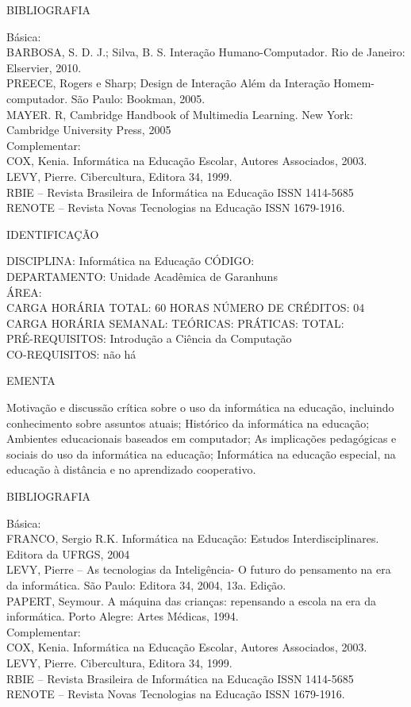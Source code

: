 \documentclass[
	12pt,				%
	openright,			%
  oneside,     %
	a4paper,			%
	chapter=TITLE,		%
	english,			%
	french,				%
	spanish,			%
	brazil				%
	]{abntex2}
\begin{document}
\begin{apendicesenv}
BIBLIOGRAFIA 

Básica:\\
BARBOSA, S. D. J.; Silva, B. S. Interação Humano-Computador. Rio de
Janeiro: Elservier, 2010.\\
PREECE, Rogers e Sharp; Design de Interação  Além da Interação
Homem-computador. São Paulo: Bookman, 2005.\\
MAYER. R, Cambridge Handbook of Multimedia Learning. New York: Cambridge
University Press, 2005\\
Complementar:\\
COX, Kenia. Informática na Educação Escolar, Autores Associados, 2003.\\
LEVY, Pierre. Cibercultura, Editora 34, 1999.\\
RBIE -- Revista Brasileira de Informática na Educação ISSN 1414-5685\\
RENOTE -- Revista Novas Tecnologias na Educação ISSN 1679-1916.

\newpage IDENTIFICAÇÃO

DISCIPLINA: Informática na Educação CÓDIGO:\\ 
DEPARTAMENTO: Unidade Acadêmica de Garanhuns\\
ÁREA: \\
CARGA HORÁRIA TOTAL: 60 HORAS NÚMERO DE CRÉDITOS: 04\\
CARGA HORÁRIA SEMANAL: TEÓRICAS: PRÁTICAS: TOTAL:\\
PRÉ-REQUISITOS: Introdução a Ciência da Computação\\
CO-REQUISITOS: não há

EMENTA 

Motivação e discussão crítica sobre o uso da informática na educação,
incluindo conhecimento sobre assuntos atuais; Histórico da informática
na educação; Ambientes educacionais baseados em computador; As
implicações pedagógicas e sociais do uso da informática na educação;
Informática na educação especial, na educação à distância e no
aprendizado cooperativo.

BIBLIOGRAFIA 

Básica:\\
FRANCO, Sergio R.K. Informática na Educação: Estudos Interdisciplinares.
Editora da UFRGS, 2004\\
LEVY, Pierre -- As tecnologias da Inteligência- O futuro do pensamento
na era da informática. São Paulo: Editora 34, 2004, 13a. Edição.\\
PAPERT, Seymour. A máquina das crianças: repensando a escola na era da
informática. Porto Alegre: Artes Médicas, 1994.\\
Complementar:\\
COX, Kenia. Informática na Educação Escolar, Autores Associados, 2003.\\
LEVY, Pierre. Cibercultura, Editora 34, 1999.\\
RBIE -- Revista Brasileira de Informática na Educação ISSN 1414-5685\\
RENOTE -- Revista Novas Tecnologias na Educação ISSN 1679-1916.


\end{apendicesenv}
\end{document}
